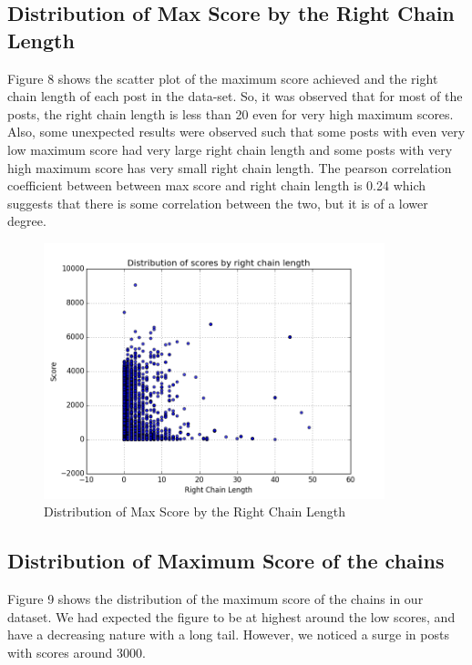 \documentclass{article} %
\begin{document}
\newpage

\subsection{Distribution of Max Score by the Right Chain Length}

Figure 8 shows the scatter plot of the maximum score achieved and the right chain length of each post in the data-set. So, it was observed that for most of the posts, the right chain length is less than 20 even for very high maximum scores. Also, some unexpected results were observed such that some posts with even very low maximum score had very large right chain length and some posts with very high maximum score has very small right chain length.
The pearson correlation coefficient between between max score and right chain length is 0.24 which suggests that there is some correlation between the two, but it is of a lower degree.

\begin{figure}[h]
\begin{center}
\includegraphics[width=3.9in]{score_right_chain.png}
\caption{Distribution of Max Score by the Right Chain Length}
\end{center}
\end{figure}

\subsection{Distribution of Maximum Score of the chains}

Figure 9 shows the distribution of the maximum score of the chains in our dataset. We had expected the figure to be at highest around the low scores, and have a decreasing nature with a long tail. However, we noticed a surge in posts with scores around 3000.
\end{document}
